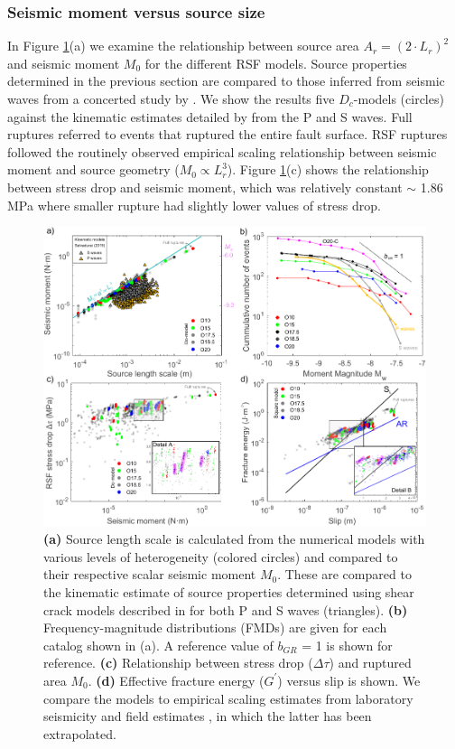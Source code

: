 \documentclass[preprint,1p, 10pt,authoryear]{elsarticle}
\begin{document}
\subsubsection{Seismic moment versus source size}
In Figure \ref{fig10}(a) we examine the relationship between source area $A_{r} = (2\cdot L_{r})^{2}$ and seismic moment $M_{0}$ for the different RSF models. Source properties determined in the previous section are compared to those inferred from seismic waves from a concerted study by \citet{Selvadurai2019}. We show the results five $D_{c}$-models (circles) against the kinematic estimates detailed by \citet{Selvadurai2019} from the P and S waves.  Full ruptures referred to events that ruptured the entire fault surface. RSF ruptures followed the routinely observed empirical scaling relationship between seismic moment and source geometry ($M_{0} \propto L_{r}^{3}$). Figure \ref{fig10}(c) shows the relationship between stress drop and seismic moment, which was relatively constant $\sim$ 1.86 MPa where smaller rupture had slightly lower values of stress drop.

\begin{figure}
	\centering
	\includegraphics[scale = 0.95]{FIG10_revised.pdf} 
	\caption{\textbf{(a)} Source length scale is calculated from the numerical models with various levels of heterogeneity (colored circles) and compared to their respective scalar seismic moment $M_{0}$. These are compared to the kinematic estimate of source properties determined using shear crack models described in \citet{Selvadurai2019} for both P and S waves (triangles). \textbf{(b)} Frequency-magnitude distributions (FMDs) are given for each catalog shown in (a). A reference value of  $b_{GR}$ = 1 is shown for reference. \textbf{(c)} Relationship between stress drop ($\Delta\tau$) and ruptured area $M_{0}$. \textbf{(d)} Effective fracture energy ($G^{'}$) versus slip is shown. We compare the models to empirical scaling estimates from laboratory seismicity \citep[black line,][]{Selvadurai2019} and field estimates \citep[blue line][]{Abercrombie2005}, in which the latter has been extrapolated.}
	\label{fig10}
\end{figure}
\end{document}
